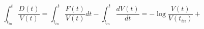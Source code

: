 \begin{equation}
\int_{t_{in}}^t \frac{D(t)}{V(t)}=\int_{t_{in}}^t \frac{F(t)}{V(t)} dt - \int_{t_{in}}^t \frac{dV(t)}{dt}  = -\log \frac{V(t)}{V(t_{in})}+
\end{equation}